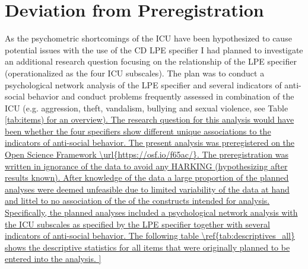 \documentclass[a4paper,12pt]{article} %
\begin{document}
\section{Deviation from Preregistration}

As the psychometric shortcomings of the ICU have been hypothesized to cause potential issues with the use of the CD LPE specifier \parencite{cardinale_reliability_2017} I had planned to investigate an additional research question focusing on the relationship of the LPE specifier (operationalized as the four ICU subscales). 
The plan was to conduct a psychological network analysis of the LPE specifier and several indicators of anti-social behavior and conduct problems frequently assessed in combination of the ICU (e.g. aggression, theft, vandalism, bullying and sexual violence, see Table \ref{tab:items) for an overview). The research question for this analysis would have been whether the four specifiers show different unique associations to the indicators of anti-social behavior.
The present analysis was preregistered on the Open Science Framework \url{https://osf.io/f65ac/}.
The preregistration was written in ignorance of the data to avoid any HARKING (hypothesizing after results known).
After knowledge of the data a large proportion of the planned analyses were deemed unfeasible due to limited variability of the data at hand and littel to no association of the of the constructs intended for analysis.

Specifically, the planned analyses included a psychological network analysis with the ICU subscales as specified by the LPE specifier together with several indicators of anti-social behavior.
The following table \ref{tab:descriptives_all} shows the descriptive statistics for all items that were originally planned to be entered into the analysis.


}
\end{document}
